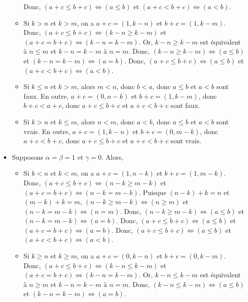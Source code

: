 \begin{itemize}[nosep]
\begin{itemize}[nosep]
                    Donc, $(a+c \leq b+c) \Leftrightarrow (a \leq b)$ et $(a+c < b+c) \Leftrightarrow (a < b)$. 
                \item Si $k > n$ et $k > m$, on a $a+c = (1,k-n)$ et $b+c =(1,k-m)$.
                    Donc, $(a+c \leq b+c) \Leftrightarrow (k-n \geq k-m)$ et $(a+c = b+c) \Leftrightarrow (k-n = k-m)$.
                    Or, $k-n \geq k-m$ est équivalent à $n \leq m$ et $k-n = k-m$ à $n = m$.
                    Donc, $(k-n \geq k-m) \Leftrightarrow (a \leq b)$ et $(k-n = k-m) \Leftrightarrow (a = b)$. 
                    Donc, $(a+c \leq b+c) \Leftrightarrow (a \leq b)$ et $(a+c < b+c) \Leftrightarrow (a < b)$. 
                \item Si $k \leq n$ et $k > m$, alors $m < n$, donc $b < a$, donc $a \leq b$ et $a < b$ sont faux.
                    En outre, $a+c = (0, n-k)$ et $b + c = (1, k-m)$, donc $b+c < a+c$, donc $a+c \leq b+c$ et $a+c < b+c$ sont faux.
                \item Si $k > n$ et $k \leq m$, alors $n < m$, donc $a < b$, donc $a \leq b$ et $a < b$ sont vrais.
                    En outre, $a+c = (1, k-n)$ et $b + c = (0, m-k)$, donc $a+c < b+c$, donc $a+c \leq b+c$ et $a+c < b+c$ sont vrais.
            \end{itemize}
        \item Supposons $\alpha = \beta = 1$ et $\gamma = 0$. 
            Alors, 
            \begin{itemize}[nosep]
                \item Si $k < n$ et $k < m$, on a $a+c = (1,n-k)$ et $b+c =(1,m-k)$.
                    Donc, $(a+c \leq b+c) \Leftrightarrow (n-k \geq m-k)$ et $(a+c = b+c) \Leftrightarrow (n-k = m-k)$.
                    Puisque $(n-k)+k = n$ et $(m-k)+k = m$, $(n-k \geq m-k) \Leftrightarrow (n \geq m)$ et $(n-k = m-k) \Leftrightarrow (n = m)$. 
                    Donc, $(n-k \geq m-k) \Leftrightarrow (a \leq b)$ et $(n-k = m-k) \Leftrightarrow (a = b)$. 
                    Donc, $(a+c \leq b+c) \Leftrightarrow (a \leq b)$ et $(a+c = b+c) \Leftrightarrow (a = b)$. 
                    Donc, $(a+c \leq b+c) \Leftrightarrow (a \leq b)$ et $(a+c < b+c) \Leftrightarrow (a < b)$. 
                \item Si $k \geq n$ et $k \geq m$, on a $a+c = (0,k-n)$ et $b+c =(0,k-m)$.
                    Donc, $(a+c \leq b+c) \Leftrightarrow (k-n \leq k-m)$ et $(a+c = b+c) \Leftrightarrow (k-n = k-m)$.
                    Or, $k-n \leq k-m$ est équivalent à $n \geq m$ et $k-n = k-m$ à $n = m$.
                    Donc, $(k-n \leq k-m) \Leftrightarrow (a \leq b)$ et $(k-n = k-m) \Leftrightarrow (a = b)$. 

\end{itemize}
\end{itemize}
